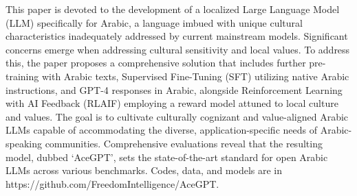 This paper is devoted to the development of   a localized Large Language Model (LLM) specifically for Arabic, a language imbued with unique cultural characteristics inadequately addressed by current mainstream models. Significant concerns emerge when addressing cultural sensitivity and local values. To address this, the paper proposes a comprehensive solution that includes further pre-training with Arabic texts, Supervised Fine-Tuning (SFT) utilizing native Arabic instructions, and GPT-4 responses in Arabic, alongside Reinforcement Learning with AI Feedback (RLAIF) employing a reward model attuned to local culture and values. The goal is to cultivate culturally cognizant and value-aligned Arabic LLMs capable of accommodating the diverse, application-specific needs of Arabic-speaking communities.  Comprehensive evaluations reveal that the resulting model, dubbed `AceGPT', sets the state-of-the-art standard for open Arabic LLMs across various benchmarks. Codes, data, and models are in https://github.com/FreedomIntelligence/AceGPT.